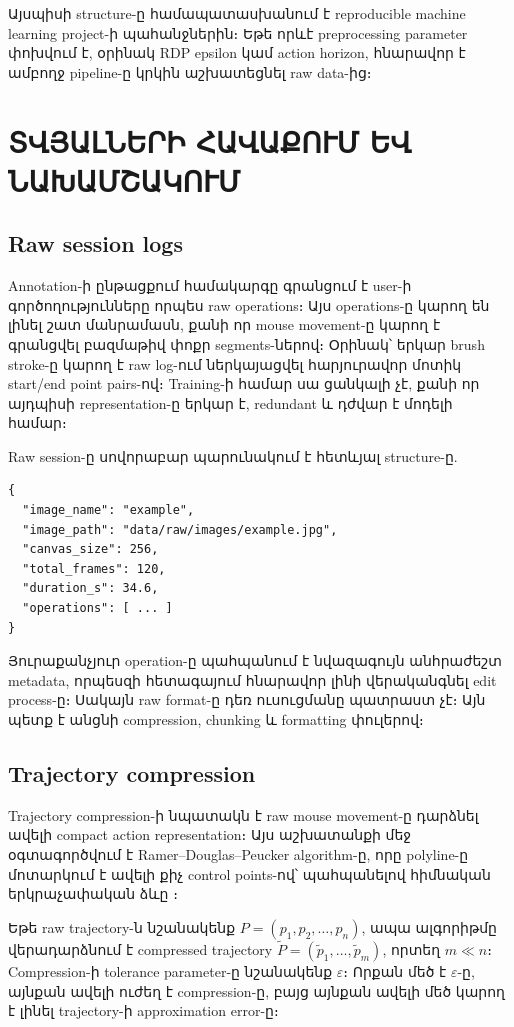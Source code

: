 \documentclass[12pt,a4paper]{report}
\newcommand{\Eng}[1]{\textenglish{#1}}
\begin{document}
Այսպիսի structure-ը համապատասխանում է reproducible machine learning project-ի պահանջներին։ Եթե որևէ preprocessing parameter փոխվում է, օրինակ \Eng{RDP epsilon} կամ action horizon, հնարավոր է ամբողջ pipeline-ը կրկին աշխատեցնել raw data-ից։

\chapter{ՏՎՅԱԼՆԵՐԻ ՀԱՎԱՔՈՒՄ ԵՎ ՆԱԽԱՄՇԱԿՈՒՄ}

\section{Raw session logs}

Annotation-ի ընթացքում համակարգը գրանցում է user-ի գործողությունները որպես raw operations։ Այս operations-ը կարող են լինել շատ մանրամասն, քանի որ mouse movement-ը կարող է գրանցվել բազմաթիվ փոքր segments-ներով։ Օրինակ՝ երկար brush stroke-ը կարող է raw log-ում ներկայացվել հարյուրավոր մոտիկ start/end point pairs-ով։ Training-ի համար սա ցանկալի չէ, քանի որ այդպիսի representation-ը երկար է, redundant և դժվար է մոդելի համար։

Raw session-ը սովորաբար պարունակում է հետևյալ structure-ը.
\begin{lstlisting}[style=code]
{
  "image_name": "example",
  "image_path": "data/raw/images/example.jpg",
  "canvas_size": 256,
  "total_frames": 120,
  "duration_s": 34.6,
  "operations": [ ... ]
}
\end{lstlisting}

Յուրաքանչյուր operation-ը պահպանում է նվազագույն անհրաժեշտ metadata, որպեսզի հետագայում հնարավոր լինի վերականգնել edit process-ը։ Սակայն raw format-ը դեռ ուսուցմանը պատրաստ չէ։ Այն պետք է անցնի compression, chunking և formatting փուլերով։

\section{Trajectory compression}

Trajectory compression-ի նպատակն է raw mouse movement-ը դարձնել ավելի compact action representation։ Այս աշխատանքի մեջ օգտագործվում է \Eng{Ramer--Douglas--Peucker} algorithm-ը, որը polyline-ը մոտարկում է ավելի քիչ control points-ով՝ պահպանելով հիմնական երկրաչափական ձևը \cite{Ramer1972,DouglasPeucker1973}։

Եթե raw trajectory-ն նշանակենք $P=(p_1,p_2,\ldots,p_n)$, ապա ալգորիթմը վերադարձնում է compressed trajectory $\tilde{P}=(\tilde{p}_1,\ldots,\tilde{p}_m)$, որտեղ $m \ll n$։ Compression-ի tolerance parameter-ը նշանակենք $\varepsilon$։ Որքան մեծ է $\varepsilon$-ը, այնքան ավելի ուժեղ է compression-ը, բայց այնքան ավելի մեծ կարող է լինել trajectory-ի approximation error-ը։
\end{document}
